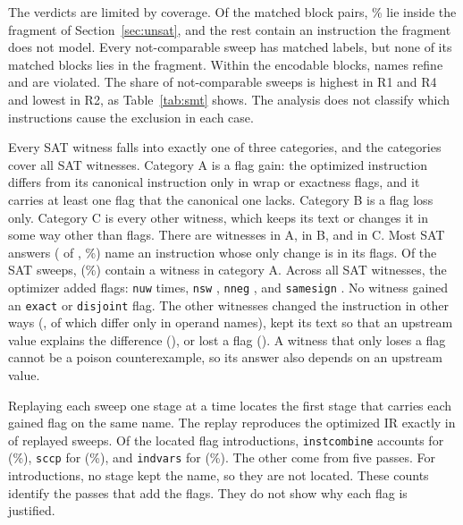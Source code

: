 

The verdicts are limited by coverage. Of the \BlocksMatched{} matched block pairs, \BlocksEncodablePct{}\% lie inside the fragment
of Section~\ref{sec:unsat}, and the rest contain an instruction the fragment does not model. Every not-comparable sweep has matched
labels, but none of its matched blocks lies in the fragment. Within the encodable blocks, \NamesRefine{} names refine and
\NamesViolated{} are violated. The share of not-comparable sweeps is highest in R1 and R4 and lowest in R2, as
Table~\ref{tab:smt} shows. The analysis does not classify which instructions cause the exclusion in each case.

Every SAT witness falls into exactly one of three categories, and the categories cover all \WitnessCatTotal{} SAT witnesses. Category
A is a flag gain: the optimized instruction differs from its canonical instruction only in wrap or exactness flags, and it carries
at least one flag that the canonical one lacks. Category B is a flag loss only. Category C is every other witness, which keeps its
text or changes it in some way other than flags. There are \WitnessCatA{} witnesses in A, \WitnessCatB{} in B, and \WitnessCatC{} in C.
Most SAT answers (\WitnessFlagOnly{} of \WitnessTotal{}, \WitnessFlagOnlyPct{}\%) name an instruction whose only change is in its
flags. Of the \SatSweeps{} SAT sweeps, \WitnessGainSweeps{} (\WitnessGainSweepsPct{}\%) contain a witness in category A. Across all
\WitnessTotal{} SAT witnesses, the optimizer added \WitnessGainedFlags{} flags: \texttt{nuw} \GainedNuw{} times, \texttt{nsw}
\GainedNsw{}, \texttt{nneg} \GainedNneg{}, and \texttt{samesign} \GainedSamesign{}. No witness gained an \texttt{exact} or
\texttt{disjoint} flag. The other witnesses changed the instruction in other ways (\WitnessOtherChange{}, of which
\WitnessRenamedOnly{} differ only in operand names), kept its text so that an upstream value explains the difference
(\WitnessUnchangedText{}), or lost a flag (\WitnessFlagLoss{}). A witness that only loses a flag cannot be a poison counterexample,
so its answer also depends on an upstream value.

Replaying each sweep one stage at a time locates the first stage that carries each gained flag on the same name. The replay
reproduces the optimized IR exactly in \ReplaysExact{} of \Replays{} replayed sweeps. Of the \IntroLocated{} located flag
introductions, \texttt{instcombine} accounts for \IntroInstcombine{} (\IntroInstcombinePct{}\%), \texttt{sccp} for \IntroSccp{}
(\IntroSccpPct{}\%), and \texttt{indvars} for \IntroIndvars{} (\IntroIndvarsPct{}\%). The other \IntroOther{} come from five passes.
For \IntroUntracked{} introductions, no stage kept the name, so they are not located. These counts identify the passes that add the
flags. They do not show why each flag is justified.

